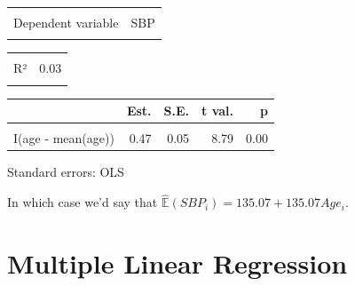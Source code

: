 \documentclass[
  letterpaper,
  DIV=11,
  numbers=noendperiod]{scrreport}
\begin{document}
\begin{table}[!h]
\centering
\begin{tabular}{lr}
\toprule
\cellcolor{gray!6}{Observations} & \cellcolor{gray!6}{2763}\\
Dependent variable & SBP\\
\cellcolor{gray!6}{Type} & \cellcolor{gray!6}{OLS linear regression}\\
\bottomrule
\end{tabular}
\end{table} \begin{table}[!h]
\centering
\begin{tabular}{lr}
\toprule
\cellcolor{gray!6}{F(1,2761)} & \cellcolor{gray!6}{77.21}\\
R² & 0.03\\
\cellcolor{gray!6}{Adj. R²} & \cellcolor{gray!6}{0.03}\\
\bottomrule
\end{tabular}
\end{table} \begin{table}[!h]
\centering
\begin{threeparttable}
\begin{tabular}{lrrrr}
\toprule
  & Est. & S.E. & t val. & p\\
\midrule
\cellcolor{gray!6}{(Intercept)} & \cellcolor{gray!6}{135.07} & \cellcolor{gray!6}{0.36} & \cellcolor{gray!6}{378.24} & \cellcolor{gray!6}{0.00}\\
I(age - mean(age)) & 0.47 & 0.05 & 8.79 & 0.00\\
\bottomrule
\end{tabular}
\begin{tablenotes}
\item Standard errors: OLS
\end{tablenotes}
\end{threeparttable}
\end{table}

In which case we'd say that
\(\hat{\mathbb E}(SBP_i) = 135.07 + 135.07 Age_i\).

\hypertarget{multiple-linear-regression}{%
\section{Multiple Linear Regression}\label{multiple-linear-regression}}
\end{document}
